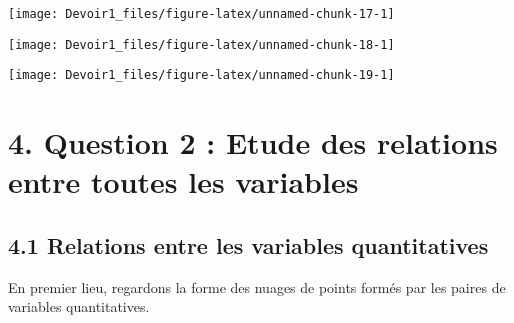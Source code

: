 \documentclass[]{article}
\newenvironment{Shaded}{\begin{snugshade}}{\end{snugshade}}
\newcommand{\KeywordTok}[1]{\textcolor[rgb]{0.13,0.29,0.53}{\textbf{#1}}}
\newcommand{\DataTypeTok}[1]{\textcolor[rgb]{0.13,0.29,0.53}{#1}}
\newcommand{\DecValTok}[1]{\textcolor[rgb]{0.00,0.00,0.81}{#1}}
\newcommand{\StringTok}[1]{\textcolor[rgb]{0.31,0.60,0.02}{#1}}
\newcommand{\OperatorTok}[1]{\textcolor[rgb]{0.81,0.36,0.00}{\textbf{#1}}}
\newcommand{\NormalTok}[1]{#1}
\begin{document}
\texttt{[image: Devoir1\_files/figure-latex/unnamed-chunk-17-1]}

\begin{Shaded}
\end{Shaded}

\texttt{[image: Devoir1\_files/figure-latex/unnamed-chunk-18-1]}

\begin{Shaded}
\end{Shaded}

\texttt{[image: Devoir1\_files/figure-latex/unnamed-chunk-19-1]}

\section{4. Question 2 : Etude des relations entre toutes les
variables}\label{question-2-etude-des-relations-entre-toutes-les-variables}

\subsection{4.1 Relations entre les variables
quantitatives}\label{relations-entre-les-variables-quantitatives}

En premier lieu, regardons la forme des nuages de points formés par les
paires de variables quantitatives.
\end{document}
